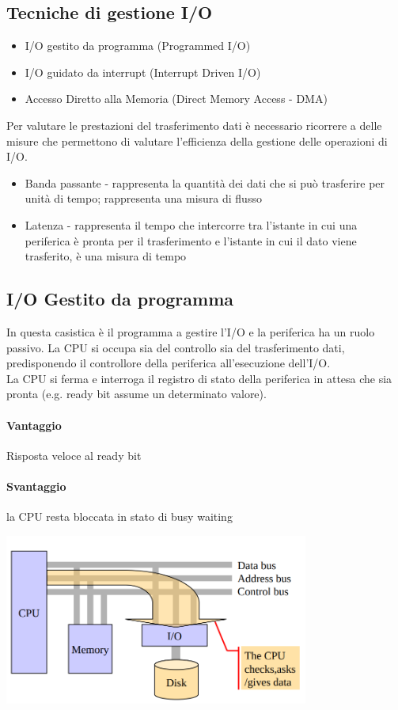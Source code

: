 \documentclass[12pt, a4paper, openany]{book}
\begin{document}
\subsection{Tecniche di gestione I/O}
\begin{itemize}
    \item I/O gestito da programma (Programmed I/O)
    \item I/O guidato da interrupt (Interrupt Driven I/O)
    \item Accesso Diretto alla Memoria (Direct Memory Access - DMA)
\end{itemize}
Per valutare le prestazioni del trasferimento dati è necessario ricorrere a delle misure che permettono
di valutare l'efficienza della gestione delle operazioni di I/O.
\begin{itemize}
    \item Banda passante - rappresenta la quantità dei dati che si può trasferire per unità di tempo;
    rappresenta una misura di flusso
    \item Latenza - rappresenta il tempo che intercorre tra l'istante in cui una periferica è pronta
    per il trasferimento e l'istante in cui il dato viene trasferito, è una misura di tempo
\end{itemize}

\subsection*{I/O Gestito da programma}
In questa casistica è il programma a gestire l'I/O e la periferica ha un ruolo passivo.
La CPU si occupa sia del controllo sia del trasferimento dati, predisponendo il controllore
della periferica all'esecuzione dell'I/O. 
\\ La CPU si ferma e interroga il registro di stato della periferica in attesa che sia pronta (e.g.
ready bit assume un determinato valore).
\paragraph*{Vantaggio} Risposta veloce al ready bit
\paragraph*{Svantaggio} la CPU resta bloccata in stato di busy waiting
\begin{center}
    \includegraphics*[width=100mm, scale=0.5]{IO gestito da programma.png}
\end{center}
\end{document}
